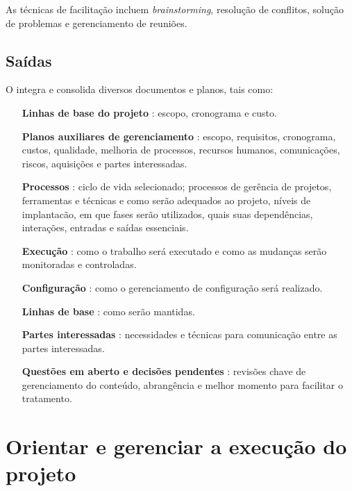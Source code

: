 As técnicas de facilitação incluem \textit{brainstorming}, resolução de conflitos, solução de problemas e gerenciamento de reuniões.

\section{Saídas}

O \planproj integra e consolida diversos documentos e planos, tais como:

\begin{itemize}

\item[\textbf{Linhas de base do projeto}] : escopo, cronograma e custo.

\item[\textbf{Planos auxiliares de gerenciamento}] : escopo, requisitos, cronograma, custos, qualidade, melhoria de processos, recursos humanos, comunicações, riscos, aquisições e partes interessadas.

\item[\textbf{Processos}] : ciclo de vida selecionado; processos de gerência de projetos, ferramentas e técnicas e como serão adequados ao projeto, níveis de implantacão, em que fases serão utilizados, quais suas dependências, interações, entradas e saídas essenciais.

\item[\textbf{Execução}] : como o trabalho será executado e como as mudanças serão monitoradas e controladas. 

\item[\textbf{Configuração}] : como o gerenciamento de configuração será realizado.

\item[\textbf{Linhas de base}] : como serão mantidas.

\item[\textbf{Partes interessadas}] : necessidades e técnicas para comunicação entre as partes interessadas.

\item[\textbf{Questões em aberto e decisões pendentes}] : revisões chave de gerenciamento do conteúdo, abrangência e melhor momento para facilitar o tratamento.
\end{itemize}

\chapter{Orientar e gerenciar a execução do projeto}

